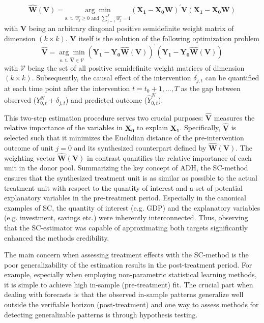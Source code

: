 \[
\widehat{\boldsymbol{W}}(\boldsymbol{V}) = 
\underset{\text{s. t. }\widehat{w_j} \geq 0 \text{ and } \sum_{j = 1}^{J} \widehat{w_j} = 1}{\arg\min}
(\boldsymbol{X_1} - \boldsymbol{X_0}\boldsymbol{W})^\prime \boldsymbol{V}(\boldsymbol{X_1} - \boldsymbol{X_0}\boldsymbol{W})
\]
with $\boldsymbol{V}$ being an arbitrary diagonal positive semidefinite weight matrix of dimension $(k \times k)$. $\boldsymbol{V}$ itself is the solution of the following optimization problem
\[
\widehat{\boldsymbol{V}} = 
\underset{\text{s. t. } \widehat{\boldsymbol{V}} \in \mathcal{V}}{\arg\min}
(\boldsymbol{Y_1} - \boldsymbol{Y_0}\boldsymbol{\widehat{W}}(\boldsymbol{V}))^\prime (\boldsymbol{Y_1} - \boldsymbol{Y_0} \boldsymbol{\widehat{W}}(\boldsymbol{V}))
\]
with $\mathcal{V}$ being the set of all positive semidefinite weight matrices of dimension $(k \times k)$. Subsequently, the causal effect of the intervention $\delta_{j,t}$ can be quantified at each time point after the intervention $t = t_0 +1, ..., T$ as the gap between observed ($Y^{N}_{0,t} + \delta_{j,t}$) and predicted outcome ($\widehat{Y}^{N}_{0,t}$).

This two-step estimation procedure serves two crucial purposes: $\widehat{\boldsymbol{V}}$ measures the relative importance of the variables in $\boldsymbol{X_0}$ to explain $\boldsymbol{X_1}$. Specifically, $\widehat{\boldsymbol{V}}$ is selected such that it minimizes the Euclidian distance of the pre-intervention outcome of unit $j = 0$ and its synthesized counterpart defined by $\widehat{\boldsymbol{W}}(\boldsymbol{V})$. The weighting vector $\widehat{\boldsymbol{W}}(\boldsymbol{V})$ in contrast quantifies the relative importance of each unit in the donor pool. Summarizing the key concept of \ac{ADH}, the \ac{SC}-method ensures that the synthesized treatment unit is as similar as possible to the actual treatment unit with respect to the quantity of interest and a set of potential explanatory variables in the pre-treatment period. Especially in the canonical examples of \ac{SC}, the quantity of interest (e.g. \ac{GDP}) and the explanatory variables (e.g. investment, savings etc.) were inherently interconnected. Thus, observing that the \ac{SC}-estimator was capable of approximating both targets significantly enhanced the methods credibility. 

The main concern when assessing treatment effects with the \ac{SC}-method is the poor 
generalizability of the estimation results in the post-treatment period. For example, especially when employing non-parametric statistical learning methods, it is simple to achieve high in-sample (pre-treatment) fit. The crucial part when dealing with forecasts is that the observed in-sample patterns generalize well outside the verifiable horizon (post-treatment) and one way to assess methods for detecting generalizable patterns is through hypothesis testing.

